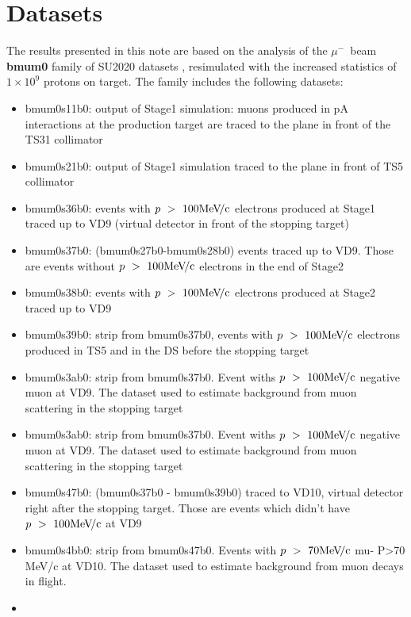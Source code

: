\documentclass[12pt]{article}
\newcommand {\MeVc}       {\mbox{$\rm MeV\!/c$}}
\newcommand {\muminus}    {\mbox{$\mu^-$}}
\begin{document}
\section {Datasets}

The results presented in this note are based on the analysis of the \muminus\ beam {\bf bmum0}
family of SU2020 datasets \cite{SU2020_DATASETS}, resimulated with the increased statistics
of $1\times 10^9$ protons on target. The family includes the following datasets: 

\begin{itemize}
\item
  bmum0s11b0: output of Stage1 simulation: muons produced in pA interactions at the production target are
  traced to the plane in front of the TS31 collimator
\item
  bmum0s21b0: output of Stage1 simulation traced to the plane in front of TS5 collimator
\item
  bmum0s36b0: events with $p ~>~ 100 \MeVc$ electrons produced at Stage1 traced up to VD9
  (virtual detector in front of the stopping target)
\item
  bmum0s37b0: (bmum0s27b0-bmum0s28b0) events traced up to VD9.
  Those are events without $p ~>~ 100 \MeVc$ electrons in the end of Stage2
\item
  bmum0s38b0: events with $p ~>~ 100 \MeVc$ electrons produced at Stage2 traced up to VD9
\item
  bmum0s39b0: strip from bmum0s37b0, events with  $p ~>~ 100 \MeVc$ electrons produced in TS5 and
  in the DS before the stopping target
\item
  bmum0s3ab0: strip from bmum0s37b0. Event withs $p ~>~ 100 \MeVc$ negative muon at VD9.
  The dataset used to estimate background from muon scattering in the stopping target
\item
  bmum0s3ab0: strip from bmum0s37b0. Event withs $p ~>~ 100 \MeVc$ negative muon at VD9.
  The dataset used to estimate background from muon scattering in the stopping target
\item
  bmum0s47b0: (bmum0s37b0 - bmum0s39b0) traced to VD10, virtual detector right after the stopping target.
  Those are events which didn't have  $p ~>~ 100 \MeVc$ at VD9
\item
  bmum0s4bb0: strip from bmum0s47b0. Events with $p ~>~ 70 \MeVc$ mu- P>70 MeV/c at VD10.
  The dataset used to estimate background from muon decays in flight.
\item

\end{itemize}
\end{document}
